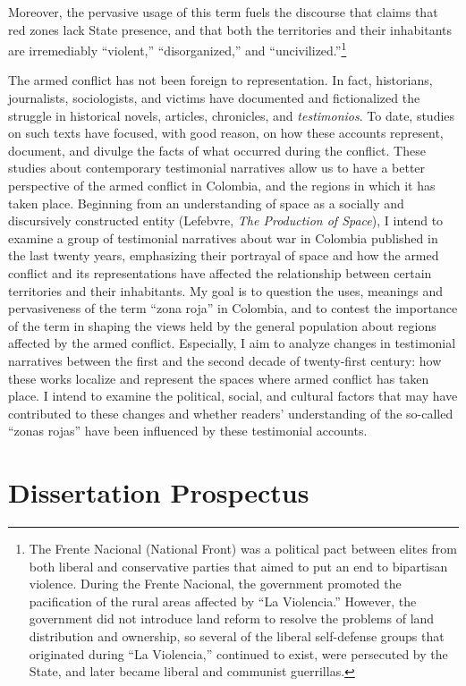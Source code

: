 \documentclass[
  11pt,
,
onecolumn,
openany
]{book}
\begin{document}
Moreover, the pervasive usage of this term fuels the discourse that claims
that red zones lack State presence, and that both the territories and their
inhabitants are irremediably ``violent,'' ``disorganized,'' and
``uncivilized.''\footnote{The Frente Nacional (National Front) was a political
  pact between elites from both liberal and conservative parties that aimed to
  put an end to bipartisan violence. During the Frente Nacional, the
  government promoted the pacification of the rural areas affected by ``La
  Violencia.'' However, the government did not introduce land reform to
  resolve the problems of land distribution and ownership, so several of the
  liberal self-defense groups that originated during ``La Violencia,''
  continued to exist, were persecuted by the State, and later became liberal
  and communist guerrillas.}

The armed conflict has not been foreign to representation. In fact,
historians, journalists, sociologists, and victims have documented and
fictionalized the struggle in historical novels, articles, chronicles, and
\emph{testimonios}. To date, studies on such texts have focused, with good
reason, on how these accounts represent, document, and divulge the facts of
what occurred during the conflict. These studies about contemporary
testimonial narratives allow us to have a better perspective of the armed
conflict in Colombia, and the regions in which it has taken place. Beginning
from an understanding of space as a socially and discursively constructed
entity (Lefebvre, \emph{The Production of Space}), I intend to examine a group
of testimonial narratives about war in Colombia published in the last twenty
years, emphasizing their portrayal of space and how the armed conflict and its
representations have affected the relationship between certain territories and
their inhabitants. My goal is to question the uses, meanings and pervasiveness
of the term ``zona roja'' in Colombia, and to contest the importance of the
term in shaping the views held by the general population about regions
affected by the armed conflict. Especially, I aim to analyze changes in
testimonial narratives between the first and the second decade of twenty-first
century: how these works localize and represent the spaces where armed
conflict has taken place. I intend to examine the political, social, and
cultural factors that may have contributed to these changes and whether
readers' understanding of the so-called ``zonas rojas'' have been influenced
by these testimonial accounts.

\hypertarget{dissertation-prospectus-1}{%
\chapter{Dissertation Prospectus}\label{dissertation-prospectus-1}}
\end{document}
